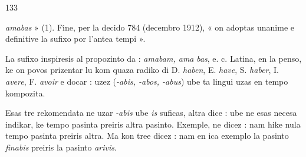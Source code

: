 \begin{VUpage}[137]{133}

\VUcontinue
\textit{amabas} » (1). Fine, per la decido 784 (decembro 1912),\nl
« on adoptas unanime e definitive la sufixo  por l'antea\nl
tempi ».

La sufixo  inspiresis al propozinto da : \textit{amabam, ama}\cc
\textit{bas}, e. c. Latina, en la penso, ke on povos prizentar lu kom\nl
quaza radiko di D. \textit{haben}, E. \textit{have}, S. \textit{haber}, I. \textit{avere}, F. \textit{avoir}\nl
e docar : uzez  (\textit{-abis, -abos, -abus}) ube ta lingui uzas \nl
en tempo kompozita.

Esas tre rekomendata ne uzar \textit{-abis} ube \textit{is} suficas, altra\cc
dice : ube ne esas necesa indikar, ke tempo pasinta preiris\nl
altra pasinto. Exemple, ne dicez : \nl
{} nam hike nula tempo pasinta preiris altra. Ma kon\cc
tree dicez :  nam en\nl
ica exemplo la pasinto \textit{finabis} preiris la pasinto \textit{arivis}.


\end{VUpage}
